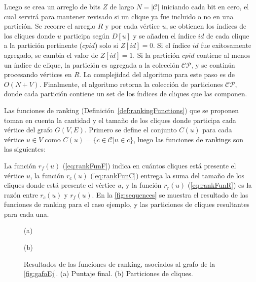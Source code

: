 Luego se crea un arreglo de bits $Z$ de largo $N = |\mathcal{C}|$ iniciando cada bit en cero, el cual servirá para mantener revisado si un clique ya fue incluido o no en una partición. Se recorre el arreglo $R$ y por cada vértice $u$, se obtienen los índices de los cliques donde $u$ participa según $D[u]$ y se añaden el índice $id$ de cada clique a la partición pertinente ($cpid$) solo si $Z[id] = 0$. Si el índice $id$ fue exitosamente agregado, se cambia el valor de $Z[id] = 1$. Si la partición $cpid$ contiene al menos un índice de clique, la partición es agregada a la colección $\mathcal{C}\mathcal{P}$, y se continúa procesando vértices en $R$. La complejidad del algoritmo para este paso es de $O(N+V)$. Finalmente, el algoritmo retorna la colección de particiones $\mathcal{C}\mathcal{P}$, donde cada partición contiene un set de los índices de cliques que las componen.



Las funciones de ranking (Definición~\ref{def:rankingFunctions}) que se proponen toman en cuenta la cantidad y el tamaño de los cliques donde participa cada vértice del grafo $G(V, E)$. Primero se define el conjunto $C(u)$ para cada vértice $u \in V$ como $C(u) = \{c \in \mathcal{C}|u \in c\}$, luego las funciones de rankings son las siguientes:



La función $r_{f}(u)$ (\autoref{eq:rankFunF}) indica en cuántos cliques está presente el vértice $u$, la función $r_{c}(u)$ (\autoref{eq:rankFunC}) entrega la suma del tamaño de los cliques donde está presente el vértice $u$, y la función $r_{r}(u)$ (\autoref{eq:rankFunR}) es la razón entre $r_{c}(u)$ y $r_{f}(u)$. En la \autoref{fig:sequences} se muestra el resultado de las funciones de ranking para el caso ejemplo, y las particiones de cliques resultantes para cada una.

\begin{figure}
    \centering

    \begin{minipage}{\textwidth}
    	\centering
    	
    	
    	(a)
    \end{minipage}

    \hfill\vline\hfill
    
    \begin{minipage}{\textwidth}
    	\centering
    	
    	
    	(b)
    \end{minipage}
    
    \caption{Resultados de las funciones de ranking, asociados al grafo de la \autoref{fig:gafoEj}. (a) Puntaje final. (b) Particiones de cliques.}
    \label{fig:sequences}
\end{figure}


